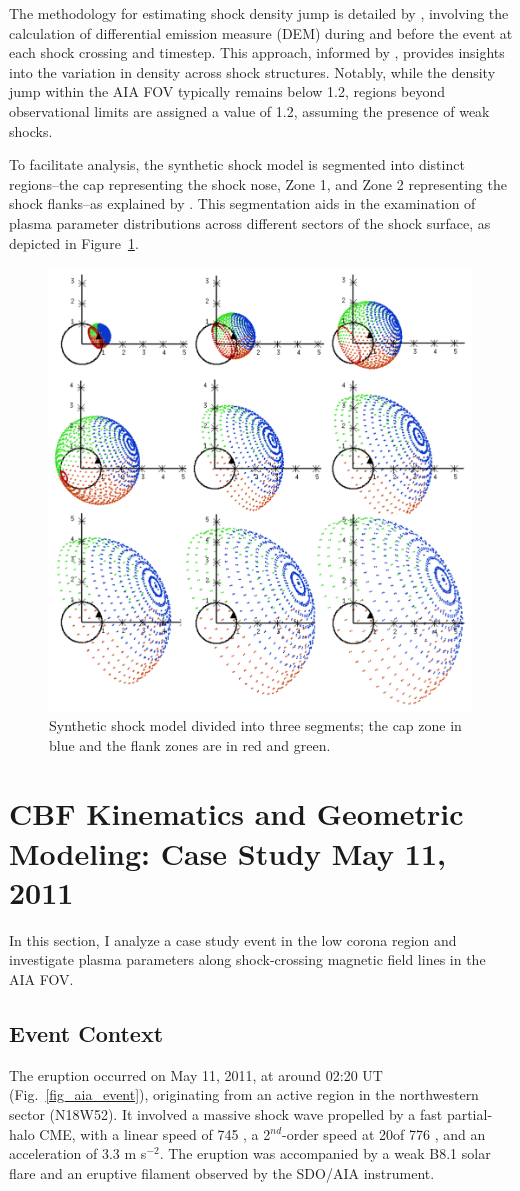 The methodology for estimating shock density jump is detailed by \citet{kozarev_2017}, involving the calculation of differential emission measure (DEM) during and before the event at each shock crossing and timestep. This approach, informed by \citet{cheung_2015}, provides insights into the variation in density across shock structures. Notably, while the density jump within the AIA FOV typically remains below 1.2, regions beyond observational limits are assigned a value of 1.2, assuming the presence of weak shocks.

To facilitate analysis, the synthetic shock model is segmented into distinct regions--the cap representing the shock nose, Zone 1, and Zone 2 representing the shock flanks--as explained by \citet{kozarev_2022}. This segmentation aids in the examination of plasma parameter distributions across different sectors of the shock surface, as depicted in Figure~\ref{fig_segments}.

\begin{figure}[!htp] %
	\centerline{\includegraphics[width=0.5\columnwidth]{chapter2/figs/fig_s2m_segments_geometry.png}}
	\caption{Synthetic shock model divided into three segments; the cap zone in blue and the flank zones are in red and green.}
	\label{fig_segments}
\end{figure}

\section{CBF Kinematics and Geometric Modeling: Case Study May 11, 2011}
In this section, I analyze a case study event in the low corona region and investigate plasma parameters along shock-crossing magnetic field lines in the AIA FOV.

\subsection{Event Context}
The eruption occurred on May 11, 2011, at around 02:20 UT (Fig.~\ref{fig_aia_event}), originating from an active region in the northwestern sector (N18W52). It involved a massive shock wave propelled by a fast partial-halo CME, with a linear speed of 745 \kms, a 2$^{nd}$-order speed at 20\rsun of 776 \kms, and an acceleration of 3.3 m s$^{-2}$. The eruption was accompanied by a weak B8.1 solar flare and an eruptive filament observed by the SDO/AIA instrument.

